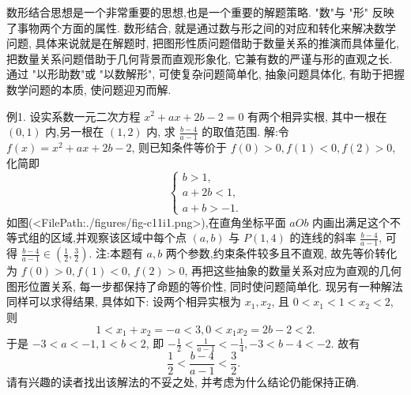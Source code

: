 
数形结合思想是一个非常重要的思想,也是一个重要的解题策略.
"数"与 "形" 反映了事物两个方面的属性.
数形结合, 就是通过数与形之间的对应和转化来解决数学问题, 具体来说就是在解题时, 把图形性质问题借助于数量关系的推演而具体量化, 把数量关系问题借助于几何背景而直观形象化, 它兼有数的严谨与形的直观之长.
通过 "以形助数"或 "以数解形", 可使复杂问题简单化, 抽象问题具体化, 有助于把握数学问题的本质, 使问题迎刃而解.



例1. 设实系数一元二次方程 $x^2+a x+2 b-2=0$ 有两个相异实根, 其中一根在 $(0,1)$ 内,另一根在 $(1,2)$ 内, 求 $\frac{b-4}{a-1}$ 的取值范围.
解:令 $f(x)=x^2+a x+2 b-2$, 则已知条件等价于 $f(0)>0, f(1)< 0, f(2)>0$, 化简即
$$
\left\{\begin{array}{l}
b>1, \\
a+2 b<1, \\
a+b>-1 .
\end{array}\right.
$$
如图(<FilePath:./figures/fig-c11i1.png>),在直角坐标平面 $a O b$ 内画出满足这个不等式组的区域,并观察该区域中每个点 $(a, b)$ 与 $P (1,4)$ 的连线的斜率 $\frac{b-4}{a-1}$, 可得 $\frac{b-4}{a-1} \in\left(\frac{1}{2}, \frac{3}{2}\right)$.
注:本题有 $a, b$ 两个参数,约束条件较多且不直观, 故先等价转化为 $f(0)>0, f(1)<0$, $f(2)>0$, 再把这些抽象的数量关系对应为直观的几何图形位置关系, 每一步都保持了命题的等价性, 同时使问题简单化.
现另有一种解法同样可以求得结果, 具体如下:
设两个相异实根为 $x_1, x_2$, 且 $0<x_1<1<x_2<2$, 则
$$
1<x_1+x_2=-a<3,0<x_1 x_2=2 b-2<2 .
$$
于是 $-3<a<-1,1<b<2$, 即 $-\frac{1}{2}<\frac{1}{a-1}<-\frac{1}{4},-3<b-4<-2$.
故有
$$
\frac{1}{2}<\frac{b-4}{a-1}<\frac{3}{2} \text {. }
$$
请有兴趣的读者找出该解法的不妥之处, 并考虑为什么结论仍能保持正确.



